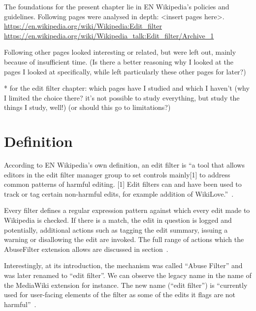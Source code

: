 The foundations for the present chapter lie in EN Wikipedia's policies and guidelines.
Following pages were analysed in depth: <insert pages here>.
\url{https://en.wikipedia.org/wiki/Wikipedia:Edit_filter}
\url{https://en.wikipedia.org/wiki/Wikipedia_talk:Edit_filter/Archive_1}

Following other pages looked interesting or related, but were left out, mainly because of insufficient time.
(Is there a better reasoning why I looked at the pages I looked at specifically, while left particularly these other pages for later?)

* for the edit filter chapter: which pages have I studied and which I haven't (why I limited the choice there? it's not possible to study everything, but study the things I study, well!)
(or should this go to limitations?)

\section{Definition}

According to EN Wikipedia's own definition, an edit filter is ``a tool that allows editors in the edit filter manager group to set controls mainly[1] to address common patterns of harmful editing.
[1] Edit filters can and have been used to track or tag certain non-harmful edits, for example addition of WikiLove.''~\cite{Wikipedia:EditFilter}.

Every filter defines a regular expression pattern against which every edit made to Wikipedia is checked.
If there is a match, the edit in question is logged and potentially, additional actions such as tagging the edit summary, issuing a warning or disallowing the edit are invoked.
The full range of actions which the AbuseFilter extension allows are discussed in section~\label{sec:technical-layer}.

Interestingly, at its introduction, the mechanism was called ``Abuse Filter'' and was later renamed to ``edit filter''.
We can observe the legacy name in the name of the MediaWiki extension for instance.
The new name (``edit filter'') is ``currently used for user-facing elements of the filter as some of the edits it flags are not harmful''~\cite{Wikipedia:EditFilter}.


